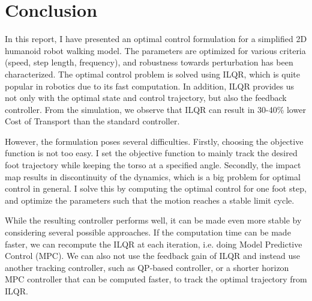 \section{Conclusion}
\label{sec:conclusion}

In this report, I have presented an optimal control formulation for a simplified 2D humanoid robot walking model. The parameters are optimized for various criteria (speed, step length, frequency), and robustness towards perturbation has been characterized. The optimal control problem is solved using ILQR, which is quite popular in robotics due to its fast computation. In addition, ILQR provides us not only with the optimal state and control trajectory, but also the feedback controller. From the simulation, we observe that ILQR can result in 30-40\% lower Cost of Transport than the standard controller.

However, the formulation poses several difficulties. Firstly, choosing the objective function is not too easy. I set the objective function to mainly track the desired foot trajectory while keeping the torso at a specified angle. Secondly, the impact map results in discontinuity of the dynamics, which is a big problem for optimal control in general. I solve this by computing the optimal control for one foot step, and optimize the parameters such that the motion reaches a stable limit cycle. 

While the resulting controller performs well, it can be made even more stable by considering several possible approaches. If the computation time can be made faster, we can recompute the ILQR at each iteration, i.e. doing Model Predictive Control (MPC). We can also not use the feedback gain of ILQR and instead use another tracking controller, such as QP-based controller, or a shorter horizon MPC controller that can be computed faster, to track the optimal trajectory from ILQR. 




